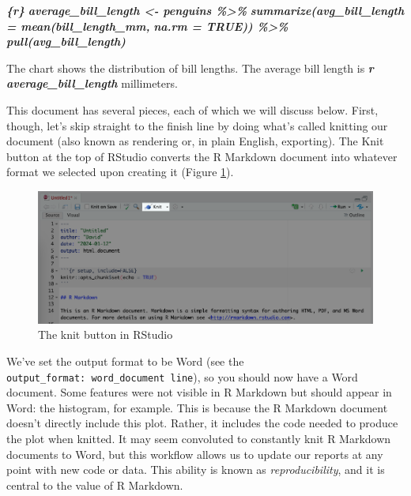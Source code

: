 \documentclass[
]{book}
\newenvironment{Shaded}{\begin{snugshade}}{\end{snugshade}}
\newcommand{\InformationTok}[1]{\textcolor[rgb]{0.56,0.35,0.01}{\textbf{\textit{#1}}}}
\newcommand{\NormalTok}[1]{#1}
\begin{document}
\begin{Shaded}
\begin{Highlighting}[]
\InformationTok{\textasciigrave{}\textasciigrave{}\textasciigrave{}\{r\}}
\InformationTok{average\_bill\_length \textless{}{-} penguins \%\textgreater{}\% }
\InformationTok{  summarize(avg\_bill\_length = mean(bill\_length\_mm,}
\InformationTok{                                   na.rm = TRUE)) \%\textgreater{}\% }
\InformationTok{  pull(avg\_bill\_length)}
\InformationTok{\textasciigrave{}\textasciigrave{}\textasciigrave{}}

\NormalTok{The chart shows the distribution of bill lengths. The average bill length is }\InformationTok{\textasciigrave{}r average\_bill\_length\textasciigrave{}}\NormalTok{ millimeters.}
\end{Highlighting}
\end{Shaded}

This document has several pieces, each of which we will discuss below. First, though, let's skip straight to the finish line by doing what's called knitting our document (also known as rendering or, in plain English, exporting). The Knit button at the top of RStudio converts the R Markdown document into whatever format we selected upon creating it (Figure \ref{fig:knit-button}).

\begin{figure}
\includegraphics[width=1\linewidth]{assets/knit-button} \caption{The knit button in RStudio}\label{fig:knit-button}
\end{figure}

We've set the output format to be Word (see the \texttt{output\_format:\ word\_document\ line}), so you should now have a Word document. Some features were not visible in R Markdown but should appear in Word: the histogram, for example. This is because the R Markdown document doesn't directly include this plot. Rather, it includes the code needed to produce the plot when knitted.
It may seem convoluted to constantly knit R Markdown documents to Word, but this workflow allows us to update our reports at any point with new code or data. This ability is known as \emph{reproducibility}, and it is central to the value of R Markdown.
\end{document}
